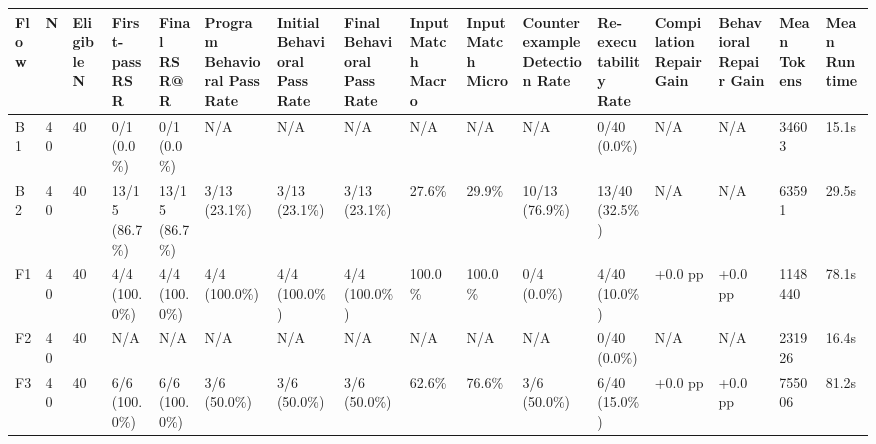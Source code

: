 \begin{longtable}{llllllllllllllll}
Flow & N & Eligible N & First-pass RSR & Final RSR@R & Program Behavioral Pass Rate & Initial Behavioral Pass Rate & Final Behavioral Pass Rate & Input Match Macro & Input Match Micro & Counterexample Detection Rate & Re-executability Rate & Compilation Repair Gain & Behavioral Repair Gain & Mean Tokens & Mean Runtime \\ \hline
B1 & 40 & 40 & 0/1 (0.0\%) & 0/1 (0.0\%) & N/A & N/A & N/A & N/A & N/A & N/A & 0/40 (0.0\%) & N/A & N/A & 34603 & 15.1s \\
B2 & 40 & 40 & 13/15 (86.7\%) & 13/15 (86.7\%) & 3/13 (23.1\%) & 3/13 (23.1\%) & 3/13 (23.1\%) & 27.6\% & 29.9\% & 10/13 (76.9\%) & 13/40 (32.5\%) & N/A & N/A & 63591 & 29.5s \\
F1 & 40 & 40 & 4/4 (100.0\%) & 4/4 (100.0\%) & 4/4 (100.0\%) & 4/4 (100.0\%) & 4/4 (100.0\%) & 100.0\% & 100.0\% & 0/4 (0.0\%) & 4/40 (10.0\%) & +0.0 pp & +0.0 pp & 1148440 & 78.1s \\
F2 & 40 & 40 & N/A & N/A & N/A & N/A & N/A & N/A & N/A & N/A & 0/40 (0.0\%) & N/A & N/A & 231926 & 16.4s \\
F3 & 40 & 40 & 6/6 (100.0\%) & 6/6 (100.0\%) & 3/6 (50.0\%) & 3/6 (50.0\%) & 3/6 (50.0\%) & 62.6\% & 76.6\% & 3/6 (50.0\%) & 6/40 (15.0\%) & +0.0 pp & +0.0 pp & 755006 & 81.2s \\
\end{longtable}

